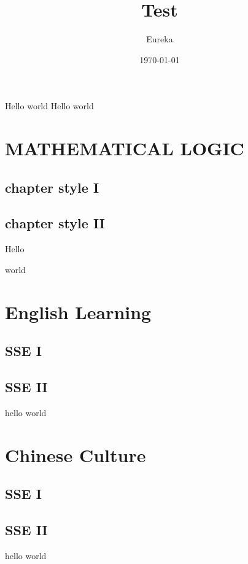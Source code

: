 \documentclass[
  hyper,
  fancy,
  class=book,
  mathSpec={envStyle=plain}
]{zlatex}
\title{Test}
\author{Eureka}
\date{\today}
\begin{document}
\maketitle
\frontmatter
\newpage\thepage Hello world 
\newpage\thepage Hello world

\mainmatter
{}
\chapter{MATHEMATICAL LOGIC}
\section{chapter style I}
\section{chapter style II}
Hello \newpage

world

\setcounter{chapter}{98}
\chapter{English Learning}
\section{SSE I}
\section{SSE II}
hello world


\chapter*{Chinese Culture}
\section{SSE I}
\section{SSE II}
hello world


\ExplSyntaxOn

\ExplSyntaxOff
\end{document}
